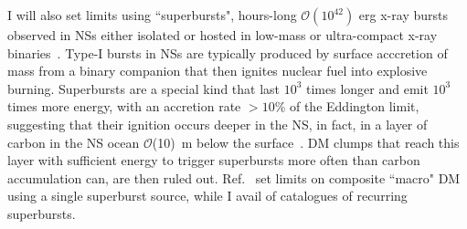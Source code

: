 \documentclass[
    twocolumn,
	prd,
        amssymb,
	preprintnumbers,
	secnumarabic,
	nofootinbib,
	superscriptaddress]{revtex4-1}
\begin{document}
I will also set limits using ``superbursts", hours-long $\mathcal{O}(10^{42})$ erg x-ray bursts observed in NSs either isolated or hosted in low-mass or ultra-compact x-ray binaries~\cite{supburst:MINBARcatalog:2020,supburst:catalog2023}.
Type-I bursts in NSs are typically produced by surface acccretion of mass from a binary companion that then ignites nuclear fuel into explosive burning. 
Superbursts are a special kind that last $10^3$ times longer and emit $10^3$ times more energy, with an accretion rate $> 10\%$ of the Eddington limit,  
suggesting that their ignition occurs deeper in the NS, in fact, in a layer of carbon in the NS ocean $\mathcal{O}$(10)~m below the surface~\cite{supburst:Cflashes:Cumming:2001wg,supburst:underZanding:2017ugu}.
DM clumps that reach this layer with sufficient energy to trigger superbursts more often than carbon accumulation can, are then ruled out.
Ref.~\cite{MACROSidhu2020} set limits on composite ``macro" DM using a single superburst source, while I avail of catalogues of recurring superbursts.
\end{document}
